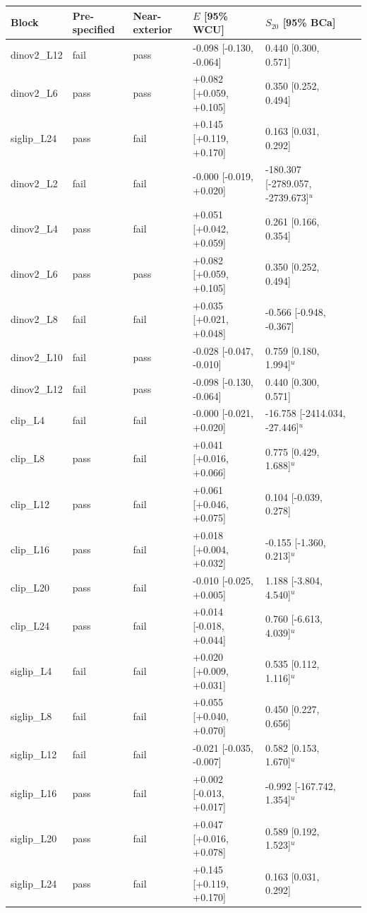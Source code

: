 \begin{tabular}{llllll}
\hline
Block & Pre-specified & Near-exterior & $E$ [95\% WCU] & $S_{20}$ [95\% BCa] \\
\hline
dinov2\_L12 & fail & pass & -0.098 [-0.130, -0.064] & 0.440 [0.300, 0.571] \\
dinov2\_L6 & pass & pass & +0.082 [+0.059, +0.105] & 0.350 [0.252, 0.494] \\
siglip\_L24 & pass & fail & +0.145 [+0.119, +0.170] & 0.163 [0.031, 0.292] \\
dinov2\_L2 & fail & fail & -0.000 [-0.019, +0.020] & -180.307 [-2789.057, -2739.673]$^u$ \\
dinov2\_L4 & pass & fail & +0.051 [+0.042, +0.059] & 0.261 [0.166, 0.354] \\
dinov2\_L6 & pass & pass & +0.082 [+0.059, +0.105] & 0.350 [0.252, 0.494] \\
dinov2\_L8 & fail & fail & +0.035 [+0.021, +0.048] & -0.566 [-0.948, -0.367] \\
dinov2\_L10 & fail & pass & -0.028 [-0.047, -0.010] & 0.759 [0.180, 1.994]$^u$ \\
dinov2\_L12 & fail & pass & -0.098 [-0.130, -0.064] & 0.440 [0.300, 0.571] \\
clip\_L4 & fail & fail & -0.000 [-0.021, +0.020] & -16.758 [-2414.034, -27.446]$^u$ \\
clip\_L8 & pass & fail & +0.041 [+0.016, +0.066] & 0.775 [0.429, 1.688]$^u$ \\
clip\_L12 & pass & fail & +0.061 [+0.046, +0.075] & 0.104 [-0.039, 0.278] \\
clip\_L16 & pass & fail & +0.018 [+0.004, +0.032] & -0.155 [-1.360, 0.213]$^u$ \\
clip\_L20 & pass & fail & -0.010 [-0.025, +0.005] & 1.188 [-3.804, 4.540]$^u$ \\
clip\_L24 & pass & fail & +0.014 [-0.018, +0.044] & 0.760 [-6.613, 4.039]$^u$ \\
siglip\_L4 & fail & fail & +0.020 [+0.009, +0.031] & 0.535 [0.112, 1.116]$^u$ \\
siglip\_L8 & fail & fail & +0.055 [+0.040, +0.070] & 0.450 [0.227, 0.656] \\
siglip\_L12 & fail & fail & -0.021 [-0.035, -0.007] & 0.582 [0.153, 1.670]$^u$ \\
siglip\_L16 & pass & fail & +0.002 [-0.013, +0.017] & -0.992 [-167.742, 1.354]$^u$ \\
siglip\_L20 & pass & fail & +0.047 [+0.016, +0.078] & 0.589 [0.192, 1.523]$^u$ \\
siglip\_L24 & pass & fail & +0.145 [+0.119, +0.170] & 0.163 [0.031, 0.292] \\
\hline
\end{tabular}
